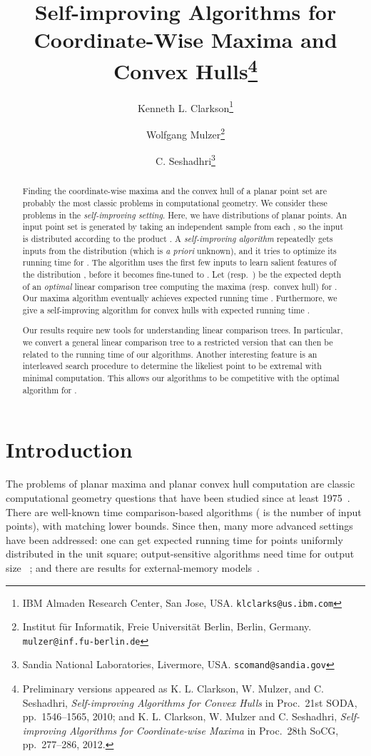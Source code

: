 \documentclass[letterpaper,11pt]{article}
\title{
  Self-improving Algorithms for Coordinate-Wise Maxima and Convex 
  Hulls\footnote{Preliminary versions appeared as
  K. L. Clarkson, W. Mulzer, and C. Seshadhri,
  \emph{Self-improving Algorithms for Convex Hulls} in Proc.~21st SODA, 
  pp.~1546--1565, 2010;
  and K. L. Clarkson, W. Mulzer and C. Seshadhri, 
  \emph{Self-improving Algorithms for
  Coordinate-wise Maxima} in Proc.~28th SoCG, pp.~277--286, 2012.
  }
}
\author{
  Kenneth L. Clarkson\footnote{IBM Almaden Research Center, San Jose, USA.
    \texttt{klclarks@us.ibm.com}
  }
  \and
  Wolfgang Mulzer\footnote{Institut f\"ur Informatik, Freie Universit\"at 
    Berlin, Berlin, Germany.
    \texttt{mulzer@inf.fu-berlin.de} 
  }
  \and
  C. Seshadhri\footnote{Sandia National Laboratories, Livermore, USA.
    \texttt{scomand@sandia.gov}
}
}
\begin{document}
 

\maketitle

\begin{abstract}
  Finding the coordinate-wise maxima and the convex 
  hull of a planar point set are probably the most 
  classic problems in computational geometry.  We 
  consider these problems in the \emph{self-improving setting}. 
  Here, we have  distributions  
  of planar points. An input point set  
  is generated by taking an independent sample  
  from each , so the input is distributed 
  according to the product . 
  A \emph{self-improving algorithm} repeatedly gets inputs 
  from the distribution  (which is \emph{a priori} 
  unknown), and it tries to optimize its running time 
  for . The algorithm uses the first few inputs to 
  learn salient features of the distribution , before 
  it becomes fine-tuned to . Let  
  (resp.~) be the expected depth 
  of an \emph{optimal} linear comparison tree computing 
  the maxima (resp.~convex hull) for . 
  Our maxima algorithm eventually achieves expected 
  running time . 
  Furthermore, we give a self-improving algorithm for convex hulls
  with expected running time .

  Our results require new tools for understanding linear 
  comparison trees. In particular, we convert 
  a general linear comparison tree to a restricted 
  version that can then be related to the running time 
  of our algorithms. Another interesting feature 
  is an interleaved search procedure 
  to determine the likeliest point to be extremal 
  with minimal computation. This allows our algorithms
  to be competitive with the optimal algorithm for 
  .
\end{abstract}

\section{Introduction}
\label{sec:intro}

The problems of planar maxima and planar convex hull 
computation are classic computational geometry questions 
that have been studied since at least 1975~\cite{KungLuPr75}. 
There are well-known  time comparison-based 
algorithms ( is the number of input points), with 
matching lower bounds. Since then,
many more advanced settings have been addressed: one can 
get expected running time  for points uniformly 
distributed in the unit square; 
output-sensitive algorithms need  time
for output size ~\cite{KirkpatrickSe86}; 
and there are results for external-memory 
models~\cite{GoodrichTsVeVi93}. 
\end{document}
